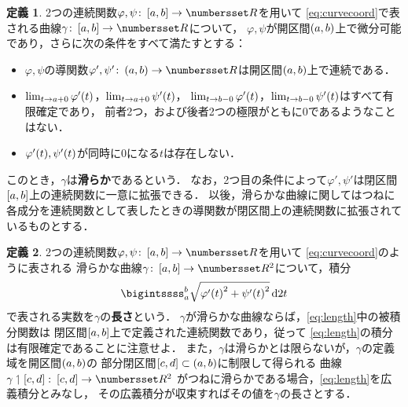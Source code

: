 \documentclass[11pt,a4paper]{ltjsarticle}
\newcommand*{\definition}[1]{\textbf{#1}}
\newcommand*{\maparrow}{\rightarrow}
\newcommand*{\intd}{\dl2}
\newcommand*{\restrict}{\upharpoonleft}
\theoremstyle{definition}
\newtheorem{dfn}{定義}[section]
\begin{document}
\begin{dfn} \label{dfn:smooth}
  2つの連続関数$\varphi, \psi \colon \interval{c}{a,b} \maparrow \Real$を用いて
  \cref{eq:curvecoord}で表される曲線$\gamma \colon \interval{c}{a,b} \maparrow \Real$について，
  $\varphi, \psi$が開区間$\interval{op}{a,b}$上で微分可能であり，さらに次の条件をすべて満たすとする：
  \begin{itemize}
    \item $\varphi, \psi$の導関数$\varphi ', \psi ' \colon \interval{op}{a,b} \maparrow \Real$は開区間$\interval{op}{a,b}$上で連続である．
    \item $\lim_{t \to a + 0}\apply{\varphi '}{t}$，$\lim_{t \to a + 0}\apply{\psi '}{t}$，
      $\lim_{t \to b - 0}\apply{\varphi '}{t}$，$\lim_{t \to b - 0}\apply{\psi '}{t}$はすべて有限確定であり，
      前者2つ，および後者2つの極限がともに0であるようなことはない．
    \item $\apply{\varphi'}{t}, \apply{\psi'}{t}$が同時に0になる$t$は存在しない．
  \end{itemize}
  このとき，$\gamma$は\definition{滑らか}であるという．
  なお，2つ目の条件によって$\varphi', \psi'$は閉区間$\interval{c}{a,b}$上の連続関数に一意に拡張できる．
  以後，滑らかな曲線に関してはつねに各成分を連続関数として表したときの導関数が閉区間上の連続関数に拡張されているものとする．
\end{dfn}

\begin{dfn} \label{dfn:length}
  2つの連続関数$\varphi, \psi \colon \interval{c}{a,b} \maparrow \Real$を用いて
  \cref{eq:curvecoord}のように表される
  滑らかな曲線$\gamma \colon \interval{c}{a,b} \maparrow \Real^2$について，積分
  \begin{align}
    \bigintssss_a^b \sqrt{ \apply{\varphi '}{t}^2 + \apply{\psi '}{t}^2} \intd t
    \label{eq:length}
  \end{align}
  で表される実数を$\gamma$の\definition{長さ}という．
  $\gamma$が滑らかな曲線ならば，\cref{eq:length}中の被積分関数は
  閉区間$\interval{c}{a,b}$上で定義された連続関数であり，従って
  \cref{eq:length}の積分は有限確定であることに注意せよ．
  また，$\gamma$は滑らかとは限らないが，$\gamma$の定義域を開区間$\interval{op}{a,b}$の
  部分閉区間$\interval{c}{c,d} \subset \interval{op}{a,b}$に制限して得られる
  曲線$\gamma \restrict \interval{c}{c,d} \colon \interval{c}{c,d} \maparrow \Real^2$
  がつねに滑らかである場合，\cref{eq:length}を広義積分とみなし，
  その広義積分が収束すればその値を$\gamma$の長さとする．
\end{dfn}
\end{document}
